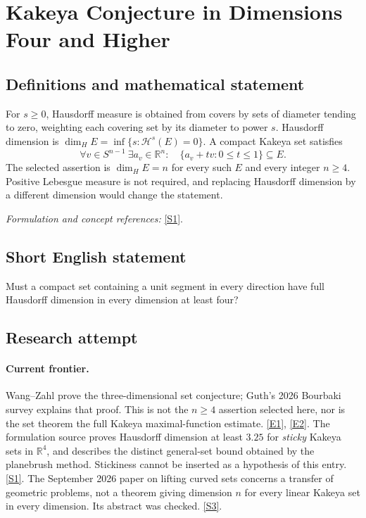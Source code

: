 \documentclass[11pt,a4paper]{article}
\newcommand{\R}{\mathbb{R}}
\newcommand{\sref}[2]{\hyperlink{source:#1:#2}{[S#2]}}
\newcommand{\eref}[2]{\hyperlink{extra:#1:#2}{[E#2]}}
\newif\ifshowcatalogue
\newcommand{\cataloguescope}[1]{\ifshowcatalogue
 \paragraph{Exact scope in the supplied catalogue.}
 \begin{quote}\small #1\end{quote}\fi}
\numberwithin{equation}{section}
\begin{document}
\setcounter{section}{0}
\clearpage
\section*{\texorpdfstring{Kakeya Conjecture in Dimensions Four and Higher}{Kakeya Conjecture in Dimensions Four and Higher}}\label{statement}
\subsection{Definitions and mathematical statement}
For $s\ge0$, Hausdorff measure is obtained from covers by sets of diameter tending to zero, weighting each covering set by its diameter to power $s$. Hausdorff dimension is $\dim_H E=\inf\{s:\mathcal H^s(E)=0\}$. A compact Kakeya set satisfies
\[
 \forall v\in S^{n-1}\ \exists a_v\in\R^n:\quad
 \{a_v+tv:0\le t\le1\}\subseteq E.
\]
The selected assertion is $\dim_H E=n$ for every such $E$ and every integer $n\ge4$. Positive Lebesgue measure is not required, and replacing Hausdorff dimension by a different dimension would change the statement.
\par\smallskip\textit{Formulation and concept references:} \sref{statement}{1}.
\cataloguescope{Prove or disprove that for every integer n >= 4, every compact set E in R\textasciicircum{}n that contains a unit line segment in every direction has Hausdorff dimension n.}
\subsection{Short English statement}
Must a compact set containing a unit segment in every direction have full Hausdorff dimension in every dimension at least four?
\subsection{Research attempt}

\paragraph{Current frontier.}
Wang--Zahl prove the three-dimensional set conjecture; Guth's 2026 Bourbaki
survey explains that proof. This is not the $n\ge4$ assertion selected here,
nor is the set theorem the full Kakeya maximal-function estimate.
\eref{statement}{1}, \eref{statement}{2}. The formulation source proves Hausdorff dimension
at least $3.25$ for \emph{sticky} Kakeya sets in $\R^4$, and describes the
distinct general-set bound obtained by the planebrush method. Stickiness
cannot be inserted as a hypothesis of this entry. \sref{statement}{1}.
The September 2026 paper on lifting curved sets concerns a transfer of
geometric problems, not a theorem giving dimension $n$ for every linear
Kakeya set in every dimension. Its abstract was checked. \sref{statement}{3}.
\end{document}
